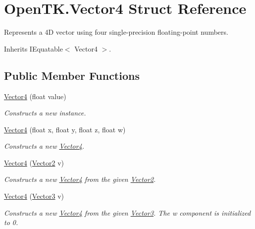 \hypertarget{struct_open_t_k_1_1_vector4}{\section{Open\-T\-K.\-Vector4 Struct Reference}
\label{struct_open_t_k_1_1_vector4}
}


Represents a 4\-D vector using four single-\/precision floating-\/point numbers. 




Inherits I\-Equatable$<$ Vector4 $>$.

\subsection*{Public Member Functions}
\begin{DoxyCompactItemize}
\item 
\hyperlink{struct_open_t_k_1_1_vector4_a10fad481da7ea448899043d4269bf98a}{Vector4} (float value)
\begin{DoxyCompactList}\small\item\em Constructs a new instance. \end{DoxyCompactList}\item 
\hyperlink{struct_open_t_k_1_1_vector4_a0b8abe9677984f1a814f06e250b92672}{Vector4} (float x, float y, float z, float w)
\begin{DoxyCompactList}\small\item\em Constructs a new \hyperlink{struct_open_t_k_1_1_vector4}{Vector4}. \end{DoxyCompactList}\item 
\hyperlink{struct_open_t_k_1_1_vector4_a29b53445e9041ad90b7567c3f588ee04}{Vector4} (\hyperlink{struct_open_t_k_1_1_vector2}{Vector2} v)
\begin{DoxyCompactList}\small\item\em Constructs a new \hyperlink{struct_open_t_k_1_1_vector4}{Vector4} from the given \hyperlink{struct_open_t_k_1_1_vector2}{Vector2}. \end{DoxyCompactList}\item 
\hyperlink{struct_open_t_k_1_1_vector4_aae7f923e9b457aecbec111e789727c8d}{Vector4} (\hyperlink{struct_open_t_k_1_1_vector3}{Vector3} v)
\begin{DoxyCompactList}\small\item\em Constructs a new \hyperlink{struct_open_t_k_1_1_vector4}{Vector4} from the given \hyperlink{struct_open_t_k_1_1_vector3}{Vector3}. The w component is initialized to 0. \end{DoxyCompactList}\item 

\end{DoxyCompactItemize}
